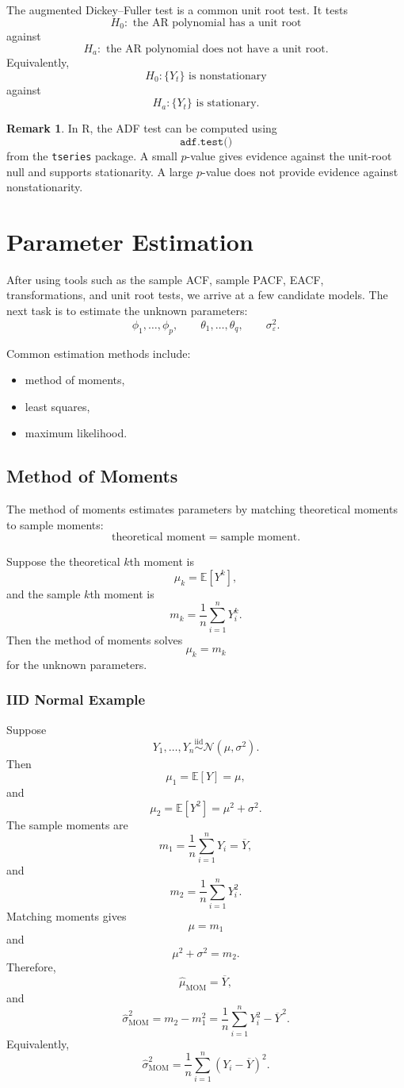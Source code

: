 \documentclass[12pt,oneside]{book}
\numberwithin{equation}{section}
\theoremstyle{definition}
\newtheorem{remark}{Remark}[section]
\theoremstyle{plain}
\theoremstyle{remark}
\newcommand{\E}{\mathbb{E}}
\newcommand{\iid}{\overset{\text{iid}}{\sim}}
\newcommand{\Normal}{\mathcal{N}}
\begin{document}
The augmented Dickey--Fuller test is a common unit root test. It tests
\[
H_0:\text{ the AR polynomial has a unit root}
\]
against
\[
H_a:\text{ the AR polynomial does not have a unit root}.
\]
Equivalently,
\[
H_0:\{Y_t\}\text{ is nonstationary}
\]
against
\[
H_a:\{Y_t\}\text{ is stationary}.
\]

\begin{remark}
In R, the ADF test can be computed using
\[
\texttt{adf.test()}
\]
from the \texttt{tseries} package. A small $p$-value gives evidence against the unit-root null and supports stationarity. A large $p$-value does not provide evidence against nonstationarity.
\end{remark}

\chapter{Parameter Estimation}

After using tools such as the sample ACF, sample PACF, EACF, transformations, and unit root tests, we arrive at a few candidate models. The next task is to estimate the unknown parameters:
\[
\phi_1,\ldots,\phi_p,
\qquad
\theta_1,\ldots,\theta_q,
\qquad
\sigma_\varepsilon^2.
\]

Common estimation methods include:
\begin{itemize}
\item method of moments,
\item least squares,
\item maximum likelihood.
\end{itemize}

\section{Method of Moments}

The method of moments estimates parameters by matching theoretical moments to sample moments:
\[
\text{theoretical moment}
=
\text{sample moment}.
\]

Suppose the theoretical $k$th moment is
\[
\mu_k=\E[Y^k],
\]
and the sample $k$th moment is
\[
m_k=\frac{1}{n}\sum_{i=1}^nY_i^k.
\]
Then the method of moments solves
\[
\mu_k=m_k
\]
for the unknown parameters.

\subsection{IID Normal Example}

Suppose
\[
Y_1,\ldots,Y_n\iid \Normal(\mu,\sigma^2).
\]
Then
\[
\mu_1=\E[Y]=\mu,
\]
and
\[
\mu_2=\E[Y^2]=\mu^2+\sigma^2.
\]
The sample moments are
\[
m_1=\frac{1}{n}\sum_{i=1}^nY_i=\overline{Y},
\]
and
\[
m_2=\frac{1}{n}\sum_{i=1}^nY_i^2.
\]
Matching moments gives
\[
\mu=m_1
\]
and
\[
\mu^2+\sigma^2=m_2.
\]
Therefore,
\[
\widehat{\mu}_{\mathrm{MOM}}=\overline{Y},
\]
and
\[
\widehat{\sigma}_{\mathrm{MOM}}^2
=
m_2-m_1^2
=
\frac{1}{n}\sum_{i=1}^nY_i^2-\overline{Y}^{\,2}.
\]
Equivalently,
\[
\widehat{\sigma}_{\mathrm{MOM}}^2
=
\frac{1}{n}\sum_{i=1}^n(Y_i-\overline{Y})^2.
\]
\end{document}
